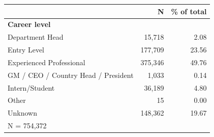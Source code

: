 \begin{tabular}{lrr}


\toprule


 & N & \% of total \\


\midrule


\multicolumn{3}{l}{\textbf{Career level}}\\ 
\midrule
Department Head     &      15,718&        2.08\\
Entry Level         &     177,709&       23.56\\
Experienced Professional&     375,346&       49.76\\
GM / CEO / Country Head / President&       1,033&        0.14\\
Intern/Student      &      36,189&        4.80\\
Other               &          15&        0.00\\
Unknown             &     148,362&       19.67\\
\midrule


\multicolumn{3}{l}{\footnotesize N =      754,372}\\


\bottomrule


\end{tabular}


